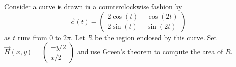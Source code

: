 \documentclass{ximera}
\author{Bart Snapp}
\begin{document}
\begin{exercise}%
  Consider a curve is drawn in a counterclockwise fashion by
  \[
  \vec{c}(t) = \begin{pmatrix}
    2\cos(t)-\cos(2t)\\ 2\sin(t)-\sin(2t)
  \end{pmatrix}
  \]
  as $t$ runs from $0$ to $2\pi$. Let $R$ be the region enclosed by
  this curve. Set $\vec{H}(x,y) = \begin{pmatrix}-y/2\\ x/2\end{pmatrix}$ and use Green's
  theorem to compute the area of $R$.
\end{exercise}
\end{document}
